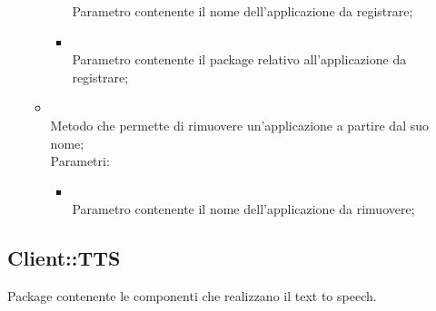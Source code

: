 \begin{itemize}
\begin{itemize}
\begin{itemize}
			Parametro contenente il nome dell'applicazione da registrare;
			\item {} \\
			Parametro contenente il package relativo all'applicazione da registrare;
		\end{itemize}
		\item[]  \\
		Metodo che permette di rimuovere un'applicazione a partire dal suo nome;\\
		Parametri:
		\begin{itemize}
			\item {} \\
			Parametro contenente il nome dell'applicazione da rimuovere;
		\end{itemize}
	\end{itemize}
\end{itemize}

\subsection{Client::TTS}
Package contenente le componenti che realizzano il text to speech.
